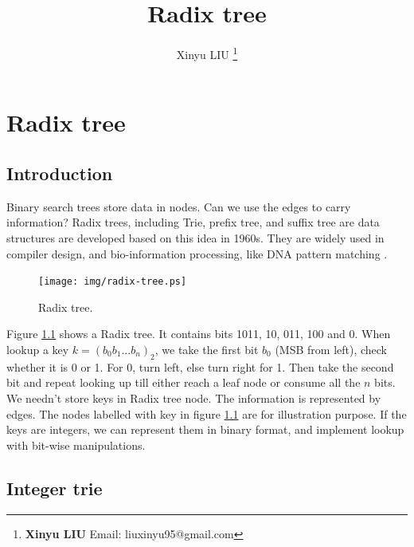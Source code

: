 \documentclass[b5paper]{article}
\begin{document}
\title{Radix tree}

\author{Xinyu LIU
\thanks{{\bfseries Xinyu LIU} \newline
  Email: liuxinyu95@gmail.com \newline}
  }

\maketitle
\fi


\ifx\wholebook\relax
\chapter{Radix tree}
\fi

\section{Introduction}
\label{introduction} 

Binary search trees store data in nodes. Can we use the edges to carry information? Radix trees, including Trie, prefix tree, and suffix tree are data structures are developed based on this idea in 1960s. They are widely used in compiler design\cite{okasaki-int-map}, and bio-information processing, like DNA pattern matching \cite{wiki-suffix-tree}.

\begin{figure}[htbp]
  \centering
  \texttt{[image: img/radix-tree.ps]}
  \caption{Radix tree.}
  \label{fig:radix-tree}
\end{figure}

Figure \ref{fig:radix-tree} shows a Radix tree. It contains bits 1011, 10, 011, 100 and 0. When lookup a key $k=(b_0b_1...b_n)_2$, we take the first bit $b_0$ (MSB from left), check whether it is 0 or 1. For 0, turn left, else turn right for 1. Then take the second bit and repeat looking up till either reach a leaf node or consume all the $n$ bits. We needn't store keys in Radix tree node. The information is represented by edges. The nodes labelled with key in figure \ref{fig:radix-tree} are for illustration purpose. If the keys are integers, we can represent them in binary format, and implement lookup with bit-wise manipulations.

\section{Integer trie}
\label{int-trie} 
\end{document}
